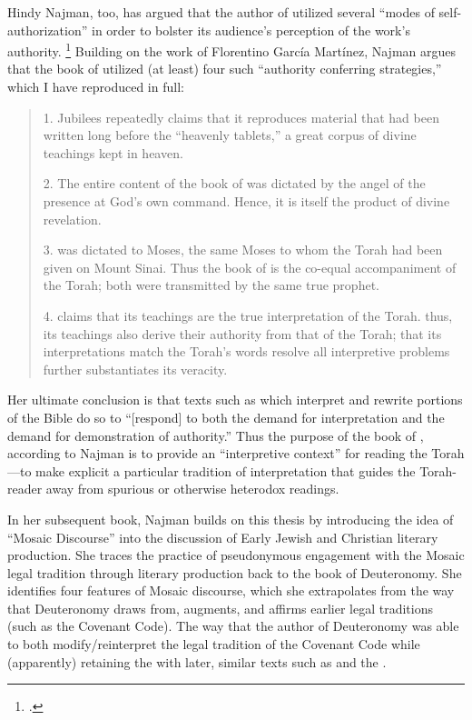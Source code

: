 Hindy Najman, too, has argued that the author of \jub utilized several ``modes of self-authorization'' in order to bolster its audience's perception of the work's authority.%
    \footnote{\cite[380]{najman_jsj1999}.}
Building on the work of Florentino García Martínez,%
    \autocite{martinez_najman-tigchelaar2012}
Najman argues that the book of \jub utilized (at least) four such ``authority conferring strategies,'' which I have reproduced in full:
    \begin{quote}
        1. Jubilees repeatedly claims that it reproduces material that had been written long before the ``heavenly tablets,'' a great corpus of divine teachings kept in heaven.

        2. The entire content of the book of \jub was dictated by the angel of the presence at God's own command. Hence, it is itself the product of divine revelation.

        3. \jub was dictated to Moses, the same Moses to whom the Torah had been given on Mount Sinai. Thus the book of \jub is the co-equal accompaniment of the Torah; both were transmitted by the same true prophet.

        4. \jub claims that its teachings are the true interpretation of the Torah. thus, its teachings also derive their authority from that of the Torah; that its interpretations match the Torah's words resolve all interpretive problems further substantiates its veracity.%
        \autocite[380]{najman_jsj1999}
    \end{quote}
\noindent
Her ultimate conclusion is that texts such as \jub which interpret and rewrite portions of the Bible do so to ``[respond] to both the demand for interpretation and the demand for demonstration of authority.''\autocite[408]{najman_jsj1999} Thus the purpose of the book of \jub, according to Najman is to provide an ``interpretive context'' for reading the Torah---to make explicit a particular tradition of interpretation that guides the Torah-reader away from spurious or otherwise heterodox readings. 

In her subsequent book, Najman builds on this thesis by introducing the idea of ``Mosaic Discourse'' into the discussion of Early Jewish and Christian literary production. She traces the practice of pseudonymous engagement with the Mosaic legal tradition through literary production back to the book of Deuteronomy.\autocite[48]{najman2003} She identifies four features of Mosaic discourse, which she extrapolates from the way that Deuteronomy draws from, augments, and affirms earlier legal traditions (such as the Covenant Code).
The way that the author of Deuteronomy was able to both modify/reinterpret the legal tradition of the Covenant Code while (apparently) retaining the  with later, similar \psgraphical texts such as \jub and the \templescroll. 

